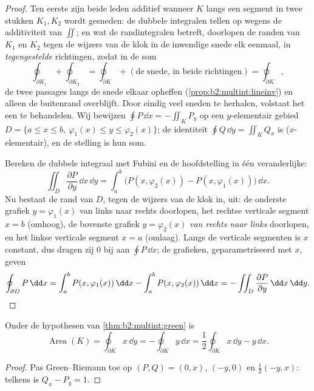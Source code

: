 \begin{proof}
Ten eerste zijn beide leden additief wanneer $K$ langs een segment
in twee stukken $K_1, K_2$ wordt gesneden: de dubbele integralen
tellen op wegens de additiviteit van $\iint$; en wat de
randintegralen betreft, doorlopen de randen van $K_1$ en $K_2$
tegen de wijzers van de klok in de inwendige snede elk eenmaal, in
\emph{tegengestelde} richtingen, zodat in de som
\[
\oint_{\partial K_1} + \oint_{\partial K_2}
= \oint_{\partial K} + (\text{de snede, in beide richtingen})
= \oint_{\partial K},
\]
de twee passages langs de snede elkaar opheffen
(\cref{prop:b2:multint:lineinv}) en alleen de buitenrand
overblijft. Door eindig veel sneden te herhalen, volstaat het een
 te behandelen. Wij bewijzen $\oint P\,\dd x =
-\iint_K P_y$ op een $y$-elementair gebied $D = \{a \leq x \leq
b,\ \varphi_1(x) \leq y \leq \varphi_2(x)\}$; de identiteit $\oint
Q\,\dd y = \iint_K Q_x$ is  ($x$-elementair), en de
stelling is hun som.

Bereken de dubbele integraal met Fubini en de hoofdstelling in één
veranderlijke:
\[
\iint_D \frac{\partial P}{\partial y}\,\dd x\,\dd y
= \int_a^b \bigl(P(x, \varphi_2(x)) - P(x, \varphi_1(x))\bigr)
\,\dd x .
\]
Nu bestaat de rand van $D$, tegen de wijzers van de klok in, uit:
de onderste grafiek $y = \varphi_1(x)$ van links naar rechts
doorlopen, het rechtse verticale segment $x = b$ (omhoog), de
bovenste grafiek $y = \varphi_2(x)$ \emph{van rechts naar links}
doorlopen, en het linkse verticale segment $x = a$ (omlaag). Langs
de verticale segmenten is $x$ constant, dus dragen zij $0$ bij aan
$\oint P\,\dd x$; de grafieken, geparametriseerd met $x$, geven
\[
\oint_{\partial D} P\,\dd x
= \int_a^b P(x, \varphi_1(x))\,\dd x
- \int_a^b P(x, \varphi_2(x))\,\dd x
= -\iint_D \frac{\partial P}{\partial y}\,\dd x\,\dd y .
\qedhere
\]
\end{proof}

\begin{corollary}\label{cor:b2:multint:area}
Onder de hypothesen van \cref{thm:b2:multint:green} is
\[
\operatorname{Area}(K)
= \oint_{\partial K} x\,\dd y
= -\oint_{\partial K} y\,\dd x
= \frac12\oint_{\partial K} x\,\dd y - y\,\dd x .
\]
\end{corollary}

\begin{proof}
Pas Green--Riemann toe op $(P, Q) = (0, x)$, $(-y, 0)$ en
$\frac12(-y, x)$: telkens is $Q_x - P_y = 1$.
\end{proof}

